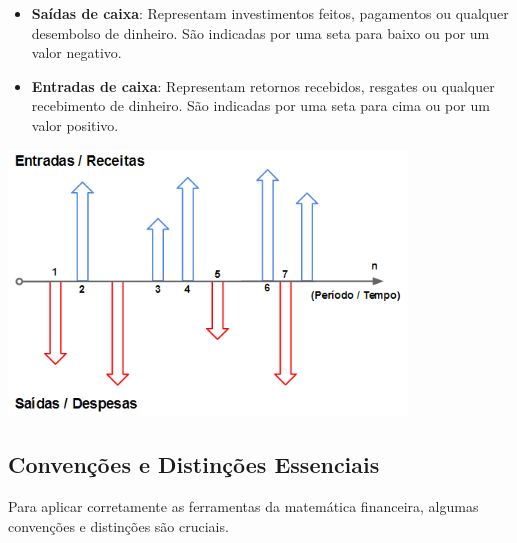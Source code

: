 \documentclass[
  a4paper,
]{book}
\begin{document}
\begin{tcolorbox}
\begin{itemize}
\item
  \textbf{Saídas de caixa}: Representam investimentos feitos, pagamentos
  ou qualquer desembolso de dinheiro. São indicadas por uma seta para
  baixo ou por um valor negativo.
\item
  \textbf{Entradas de caixa}: Representam retornos recebidos, resgates
  ou qualquer recebimento de dinheiro. São indicadas por uma seta para
  cima ou por um valor positivo. \vspace{0.5cm}
\end{itemize}

\begin{center}
\includegraphics[width=4.16667in,height=\textheight,keepaspectratio]{resources/01-diagrama.png}
\end{center}

\subsection*{Convenções e Distinções
Essenciais}\label{convenuxe7uxf5es-e-distinuxe7uxf5es-essenciais}

Para aplicar corretamente as ferramentas da matemática financeira,
algumas convenções e distinções são cruciais.


\end{tcolorbox}
\end{document}
